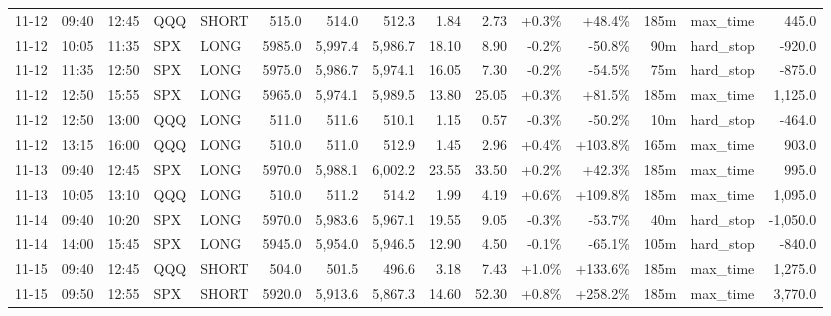 \documentclass[11pt,a4paper,twoside]{article}
\begin{document}
\begin{landscape}
\begin{center}
\begin{longtable}{>{\color{txtmain}}l l l l l r r r r r r r r >{\color{txtmain}}l r}
11-12 & 09:40 & 12:45 & QQQ & SHORT & 515.0 & 514.0 & 512.3 & 1.84 & 2.73 & \textcolor{wingreen}{+0.3\%} & \textcolor{wingreen}{+48.4\%} & 185m & max\_time & \textcolor{wingreen}{445.0} \\
11-12 & 10:05 & 11:35 & SPX & LONG & 5985.0 & 5,997.4 & 5,986.7 & 18.10 & 8.90 & \textcolor{lossred}{-0.2\%} & \textcolor{lossred}{-50.8\%} & 90m & hard\_stop & \textcolor{lossred}{-920.0} \\
11-12 & 11:35 & 12:50 & SPX & LONG & 5975.0 & 5,986.7 & 5,974.1 & 16.05 & 7.30 & \textcolor{lossred}{-0.2\%} & \textcolor{lossred}{-54.5\%} & 75m & hard\_stop & \textcolor{lossred}{-875.0} \\
11-12 & 12:50 & 15:55 & SPX & LONG & 5965.0 & 5,974.1 & 5,989.5 & 13.80 & 25.05 & \textcolor{wingreen}{+0.3\%} & \textcolor{wingreen}{+81.5\%} & 185m & max\_time & \textcolor{wingreen}{1,125.0} \\
11-12 & 12:50 & 13:00 & QQQ & LONG & 511.0 & 511.6 & 510.1 & 1.15 & 0.57 & \textcolor{lossred}{-0.3\%} & \textcolor{lossred}{-50.2\%} & 10m & hard\_stop & \textcolor{lossred}{-464.0} \\
11-12 & 13:15 & 16:00 & QQQ & LONG & 510.0 & 511.0 & 512.9 & 1.45 & 2.96 & \textcolor{wingreen}{+0.4\%} & \textcolor{wingreen}{+103.8\%} & 165m & max\_time & \textcolor{wingreen}{903.0} \\
11-13 & 09:40 & 12:45 & SPX & LONG & 5970.0 & 5,988.1 & 6,002.2 & 23.55 & 33.50 & \textcolor{wingreen}{+0.2\%} & \textcolor{wingreen}{+42.3\%} & 185m & max\_time & \textcolor{wingreen}{995.0} \\
11-13 & 10:05 & 13:10 & QQQ & LONG & 510.0 & 511.2 & 514.2 & 1.99 & 4.19 & \textcolor{wingreen}{+0.6\%} & \textcolor{wingreen}{+109.8\%} & 185m & max\_time & \textcolor{wingreen}{1,095.0} \\
11-14 & 09:40 & 10:20 & SPX & LONG & 5970.0 & 5,983.6 & 5,967.1 & 19.55 & 9.05 & \textcolor{lossred}{-0.3\%} & \textcolor{lossred}{-53.7\%} & 40m & hard\_stop & \textcolor{lossred}{-1,050.0} \\
11-14 & 14:00 & 15:45 & SPX & LONG & 5945.0 & 5,954.0 & 5,946.5 & 12.90 & 4.50 & \textcolor{lossred}{-0.1\%} & \textcolor{lossred}{-65.1\%} & 105m & hard\_stop & \textcolor{lossred}{-840.0} \\
11-15 & 09:40 & 12:45 & QQQ & SHORT & 504.0 & 501.5 & 496.6 & 3.18 & 7.43 & \textcolor{wingreen}{+1.0\%} & \textcolor{wingreen}{+133.6\%} & 185m & max\_time & \textcolor{wingreen}{1,275.0} \\
11-15 & 09:50 & 12:55 & SPX & SHORT & 5920.0 & 5,913.6 & 5,867.3 & 14.60 & 52.30 & \textcolor{wingreen}{+0.8\%} & \textcolor{wingreen}{+258.2\%} & 185m & max\_time & \textcolor{wingreen}{3,770.0} \\

\end{longtable}
\end{center}
\end{landscape}
\end{document}
